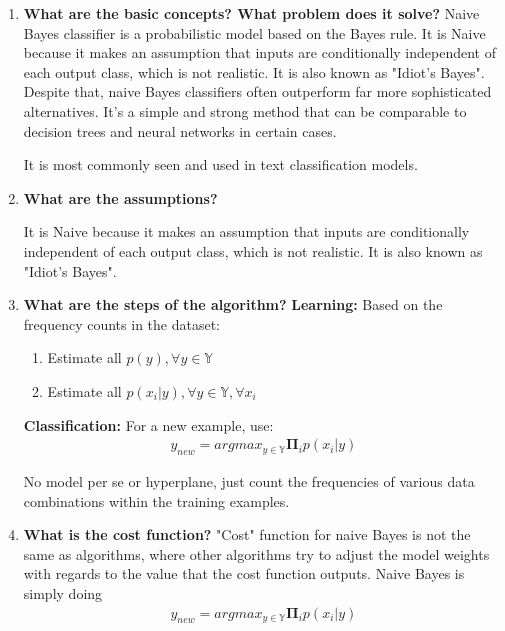 \documentclass{article}
\begin{document}
\noindent
\begin{enumerate}
    \item \textbf{What are the basic concepts? What problem does it solve?}
    \noindent 
    \smallbreak
    Naive Bayes classifier is a probabilistic model based on the Bayes rule. It is Naive because it makes an assumption that inputs are conditionally independent of each output class, which is not realistic. It is also known as "Idiot's Bayes"\cite{1}. Despite that, naive Bayes classifiers often outperform far more sophisticated alternatives. It's a simple and strong method that can be comparable to decision trees and neural networks in certain cases.
    
    It is most commonly seen and used in text classification models. 
    
    \item \textbf{What are the assumptions?}
    \noindent 
    \smallbreak
    
    It is Naive because it makes an assumption that inputs are conditionally independent of each output class, which is not realistic. It is also known as "Idiot's Bayes"\cite{1}.
    
    \item \textbf{What are the steps of the algorithm?}
    \noindent 
    \smallbreak
    \textbf{Learning:} Based on the frequency counts in the dataset:
    \begin{enumerate}
        \item Estimate all $p(y), \forall y \in \mathbb{Y}$
        \item Estimate all $p(x_i|y), \forall y \in \mathbb{Y}, \forall x_i$
    \end{enumerate}
    \textbf{Classification:} For a new example, use:\\
    \begin{align*}
        y_{new} = argmax_{y \in \mathbb{Y}} \mathbf{\Pi}_{i} p(x_i|y)    
    \end{align*}
    
    No model per se or hyperplane, just count the frequencies of various data combinations within the training examples.
    
    \item \textbf{What is the cost function?}
    \noindent 
    \smallbreak
    "Cost" function for naive Bayes is not the same as algorithms, where other algorithms try to adjust the model weights with regards to the value that the cost function outputs. Naive Bayes is simply doing 
    \begin{align*}
        y_{new} = argmax_{y \in \mathbb{Y}} \mathbf{\Pi}_{i} p(x_i|y)    
    \end{align*}
    

\end{enumerate}
\end{document}
